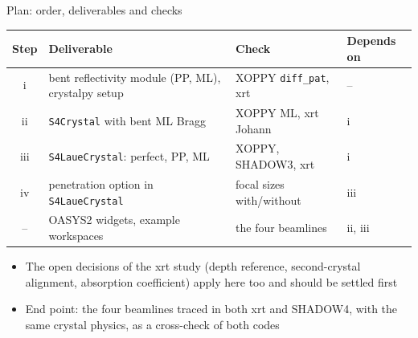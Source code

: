 \documentclass[aspectratio=169,10pt]{beamer}
\begin{document}
\begin{frame}{Plan: order, deliverables and checks}
  \footnotesize
  \centering
  \begin{tabular}{@{}clll@{}}
    \toprule
    Step & Deliverable & Check & Depends on \\
    \midrule
    i   & bent reflectivity module (PP, ML), crystalpy setup     & XOPPY \texttt{diff\_pat}, xrt & -- \\
    ii  & \texttt{S4Crystal} with bent ML Bragg                  & XOPPY ML, xrt Johann         & i \\
    iii & \texttt{S4LaueCrystal}: perfect, PP, ML                & XOPPY, SHADOW3, xrt & i \\
    iv  & penetration option in \texttt{S4LaueCrystal}           & focal sizes with/without      & iii \\
    --  & OASYS2 widgets, example workspaces                     & the four beamlines            & ii, iii \\
    \bottomrule
  \end{tabular}

  \vspace{1em}
  \small\raggedright
  \begin{itemize}
    \item The open decisions of the xrt study (depth reference, second-crystal alignment,
      absorption coefficient) apply here too and should be settled first
    \item End point: the four beamlines traced in both xrt and SHADOW4, with the same crystal
      physics, as a cross-check of both codes
  \end{itemize}
\end{frame}
\end{document}
